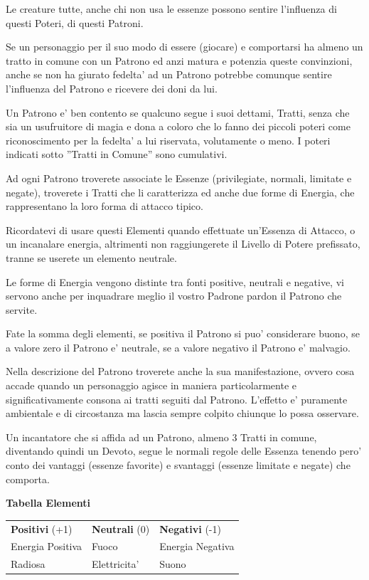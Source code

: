 \documentclass[a4paper,11pt,twoside,openany]{book}
\begin{document}
{		Le creature tutte, anche chi non usa le essenze possono sentire l'influenza di questi Poteri, di questi Patroni.
		
		Se un personaggio per il suo modo di essere (giocare) e comportarsi ha almeno un tratto in comune con un Patrono ed anzi matura e potenzia queste convinzioni, anche se non ha giurato fedelta' ad un Patrono potrebbe comunque sentire l'influenza del Patrono e ricevere dei doni da lui.
		
		Un Patrono e' ben contento se qualcuno segue i suoi dettami, Tratti, senza che sia un usufruitore di magia e dona a coloro che lo fanno dei piccoli poteri come riconoscimento per la fedelta' a lui riservata, volutamente o meno. I poteri indicati sotto ''Tratti in Comune'' sono cumulativi.
		
		Ad ogni Patrono troverete associate le Essenze (privilegiate, normali, limitate e negate), troverete i Tratti che li caratterizza ed anche due forme di Energia, che rappresentano la loro forma di attacco tipico. 
		
		Ricordatevi di usare questi Elementi quando effettuate un'Essenza di Attacco, o un incanalare energia, altrimenti non raggiungerete il Livello di Potere prefissato, tranne se userete un elemento neutrale. 
		
		Le forme di Energia vengono distinte tra fonti positive, neutrali e negative, vi servono anche per inquadrare meglio il vostro Padrone pardon il Patrono che servite.
		
		Fate la somma degli elementi, se positiva il Patrono si puo' considerare buono, se a valore zero il Patrono e' neutrale, se a valore negativo il Patrono e' malvagio.
		
		Nella descrizione del Patrono troverete anche la sua manifestazione, ovvero cosa accade quando un personaggio agisce in maniera particolarmente e significativamente consona ai tratti seguiti dal Patrono. L'effetto e' puramente ambientale e di circostanza ma lascia sempre colpito chiunque lo possa osservare.
		
		Un incantatore che si affida ad un Patrono, almeno 3 Tratti in comune, diventando quindi un Devoto, segue le normali regole delle Essenza tenendo pero' conto dei vantaggi (essenze favorite) e svantaggi (essenze limitate e negate) che comporta.
		
		\bigskip
		
		\textbf{Tabella Elementi}
		\medskip
		
		\begin{tabular}{lll}
			\toprule
			\textbf{Positivi} (+1) & \textbf{Neutrali} (0) & \textbf{Negativi} (-1)\tabularnewline
			Energia Positiva & Fuoco & Energia Negativa\tabularnewline
			Radiosa & Elettricita' & Suono\tabularnewline
		\end{tabular}
		\bigskip
		
}
\end{document}
